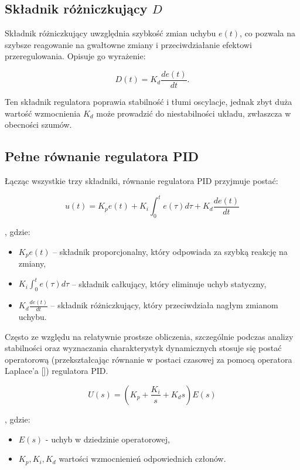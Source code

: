 \subsection{Składnik różniczkujący $D$}

Składnik różniczkujący uwzględnia szybkość zmian uchybu $e(t)$, co pozwala na szybsze reagowanie na gwałtowne zmiany i przeciwdziałanie efektowi przeregulowania. Opisuje go wyrażenie:

\begin{equation}
D(t) = K_d \frac{de(t)}{dt} .
\end{equation}

Ten składnik regulatora poprawia stabilność i tłumi oscylacje, jednak zbyt duża wartość wzmocnienia $K_d$ może prowadzić do niestabilności układu, zwłaszcza w obecności szumów.

\subsection{Pełne równanie regulatora PID}

Łącząc wszystkie trzy składniki, równanie regulatora PID przyjmuje postać:

\begin{equation}
    u(t) = K_p e(t) + K_i \int_{0}^{t} e(\tau) d\tau + K_d \frac{de(t)}{dt}
    \label{eq:pid-ideal}
\end{equation}

, gdzie:
\begin{itemize}
    \item $K_p e(t)$ – składnik proporcjonalny, który odpowiada za szybką reakcję na zmiany,
    \item $K_i \int_{0}^{t} e(\tau) d\tau$ – składnik całkujący, który eliminuje uchyb statyczny,
    \item $K_d \frac{de(t)}{dt}$ – składnik różniczkujący, który przeciwdziała nagłym zmianom uchybu.
\end{itemize}


Często ze względu na relatywnie prostsze obliczenia, szczególnie podczas analizy stabilności oraz wyznaczania charakterystyk dynamicznych stosuje się postać operatorową (przekształcając równanie w postaci czasowej za pomocą operatora Laplace’a []) regulatora PID. 

\begin{equation}
    U(s) = (K_p + \frac{K_i}{s} + K_d s) E(s)
\end{equation}

, gdzie:
\begin{itemize}
    \item $E(s)$ - uchyb w dziedzinie operatorowej,
    \item $K_p, K_i, K_d$ wartości wzmocnienień odpowiednich członów.
\end{itemize}


